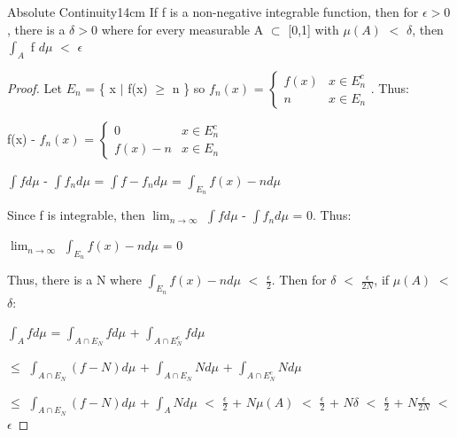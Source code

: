     \vspace{0.5cm}



    \begin{wtheorem}{Absolute Continuity}{14cm}
        If f is a non-negative integrable function, then for $\epsilon > 0$,
        there is a $\delta > 0$ where for every measurable A $\subset$ [0,1]
        with $\mu(A)$ $<$ $\delta$, then $\int_A$ f $d\mu$ $<$ $\epsilon$
    \end{wtheorem}

    \begin{proof}
        Let $E_n$ = \{ x $|$ f(x) $\geq$ n \}
        so $f_n(x)$
        = $\begin{cases}
            f(x) & x \in E_n^c \\
            n & x \in E_n
        \end{cases}$.
        Thus:
        
        \hspace{0.5cm}
        f(x) - $f_n(x)$
        = $\begin{cases}
            0 & x \in E_n^c \\
            f(x) - n & x \in E_n
        \end{cases}$

        \hspace{0.5cm}
        $\int f d\mu$ - $\int f_n d\mu$
        = $\int f-f_n d\mu$
        = $\int_{E_n} f(x)-n d\mu$

        Since f is integrable, then
        $\lim_{n \rightarrow \infty}$ $\int f d\mu$ - $\int f_n d\mu$ = 0. Thus:

        \hspace{0.5cm}
        $\lim_{n \rightarrow \infty}$ $\int_{E_n} f(x)-n d\mu$ = 0

        Thus, there is a N where
        $\int_{E_n} f(x)-n d\mu$ $<$ $\frac{\epsilon}{2}$.
        Then for $\delta$ $<$ $\frac{\epsilon}{2N}$, if $\mu(A)$ $<$ $\delta$:

        \hspace{0.5cm}
        $\int_A f d\mu$
        = $\int_{A \cap E_N} f d\mu$ + $\int_{A \cap E_N^c} f d\mu$

        \hspace{1.9cm}
        $\leq$ $\int_{A \cap E_N} (f-N) d\mu$
                + $\int_{A \cap E_N} N d\mu$
                + $\int_{A \cap E_N^c} N d\mu$

        \hspace{1.9cm}
        $\leq$ $\int_{A \cap E_N} (f-N) d\mu$
                + $\int_A N d\mu$
        $<$ $\frac{\epsilon}{2}$ + $N\mu(A)$
        $<$ $\frac{\epsilon}{2}$ + $N\delta$
        $<$ $\frac{\epsilon}{2}$ + $N\frac{\epsilon}{2N}$
        $<$ $\epsilon$
    \end{proof}

